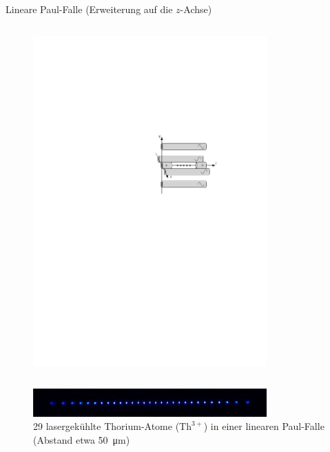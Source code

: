 \documentclass[12pt,xcolor=dvipsnames]{beamer}
\begin{document}
\begin{frame}{Lineare Paul-Falle (Erweiterung auf die $z$-Achse)}
	\begin{columns}[t]
		
			\begin{figure}[h]
				\centering
				\includegraphics[width=0.8\textwidth]{./figures/lineare_paulfalle.pdf}
			\end{figure}
	\end{columns}
	
	\begin{figure}[h]
		\centering
		\includegraphics[width=0.8\textwidth]{./figures/29_laser_cooled_ion_chain.jpg}
		\caption{29 lasergekühlte Thorium-Atome ($\mathrm{Th}^{3+}$) in einer linearen Paul-Falle (Abstand etwa \SI{50}{\micro\metre}) \cite{campbell}}
	\end{figure}
	
\end{frame}
\end{document}
